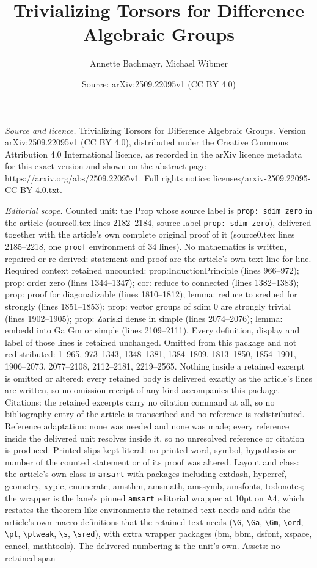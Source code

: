 \documentclass[10pt,a4paper]{amsart}
\title[Trivializing Torsors for Difference Algebraic Groups]{Trivializing Torsors for Difference Algebraic Groups}
\author{Annette Bachmayr, Michael Wibmer}
\date{Source: arXiv:2509.22095v1 (CC BY 4.0)}
\begin{document}
\maketitle

\noindent\emph{Source and licence.} Trivializing Torsors for Difference Algebraic Groups. Version arXiv:2509.22095v1 (CC BY 4.0), distributed under the Creative Commons Attribution 4.0 International licence, as recorded in the arXiv licence metadata for this exact version and shown on the abstract page https://arxiv.org/abs/2509.22095v1. Full rights notice: licenses/arxiv-2509.22095-CC-BY-4.0.txt.\par\smallskip

\noindent\textit{Editorial scope.} Counted unit: the Prop whose source label is \texttt{prop: sdim zero} in the article (source0.tex lines 2182--2184, source label \texttt{prop: sdim zero}), delivered together with the article's own complete original proof of it (source0.tex lines 2185--2218, one \texttt{proof} environment of 34 lines). No mathematics is written, repaired or re-derived: statement and proof are the article's own text line for line. Required context retained uncounted: prop:InductionPrinciple (lines 966--972); prop: order zero (lines 1344--1347); cor: reduce to connected (lines 1382--1383); prop: proof for diagonalizable (lines 1810--1812); lemma: reduce to sredued for strongly (lines 1851--1853); prop: vector groups of sdim 0 are strongly trivial (lines 1902--1905); prop: Zariski dense in simple (lines 2074--2076); lemma: embedd into Ga Gm or simple (lines 2109--2111). Every definition, display and label of those lines is retained unchanged. Omitted from this package and not redistributed: 1--965, 973--1343, 1348--1381, 1384--1809, 1813--1850, 1854--1901, 1906--2073, 2077--2108, 2112--2181, 2219--2565. Nothing inside a retained excerpt is omitted or altered: every retained body is delivered exactly as the article's lines are written, so no omission receipt of any kind accompanies this package. Citations: the retained excerpts carry no citation command at all, so no bibliography entry of the article is transcribed and no reference is redistributed. Reference adaptation: none was needed and none was made; every reference inside the delivered unit resolves inside it, so no unresolved reference or citation is produced. Printed slips kept literal: no printed word, symbol, hypothesis or number of the counted statement or of its proof was altered. Layout and class: the article's own class is \texttt{amsart} with packages including extdash, hyperref, geometry, xypic, enumerate, amsthm, amsmath, amssymb, amsfonts, todonotes; the wrapper is the lane's pinned \texttt{amsart} editorial wrapper at 10pt on A4, which restates the theorem-like environments the retained text needs and adds the article's own macro definitions that the retained text needs (\texttt{\textbackslash G}, \texttt{\textbackslash Ga}, \texttt{\textbackslash Gm}, \texttt{\textbackslash ord}, \texttt{\textbackslash pt}, \texttt{\textbackslash ptweak}, \texttt{\textbackslash s}, \texttt{\textbackslash sred}), with extra wrapper packages (bm, bbm, dsfont, xspace, cancel, mathtools). The delivered numbering is the unit's own. Assets: no retained span 
\end{document}
